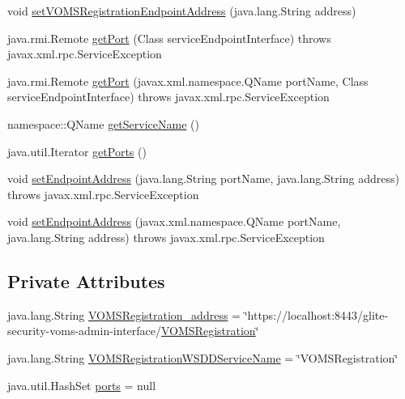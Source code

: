\begin{DoxyCompactItemize}
\item 
void \hyperlink{classorg_1_1glite_1_1security_1_1voms_1_1service_1_1registration_1_1VOMSRegistrationServiceLocator_a027076b3679899b742d499429827f488}{setVOMSRegistrationEndpointAddress} (java.lang.String address)
\item 
java.rmi.Remote \hyperlink{classorg_1_1glite_1_1security_1_1voms_1_1service_1_1registration_1_1VOMSRegistrationServiceLocator_ac0d38d86947d56afe47bd4042eaf2dbd}{getPort} (Class serviceEndpointInterface)  throws javax.xml.rpc.ServiceException 
\item 
java.rmi.Remote \hyperlink{classorg_1_1glite_1_1security_1_1voms_1_1service_1_1registration_1_1VOMSRegistrationServiceLocator_a138e62089c2450c8eacf2b94718d07cb}{getPort} (javax.xml.namespace.QName portName, Class serviceEndpointInterface)  throws javax.xml.rpc.ServiceException 
\item 
namespace::QName \hyperlink{classorg_1_1glite_1_1security_1_1voms_1_1service_1_1registration_1_1VOMSRegistrationServiceLocator_a7f4a3a45a9d544e0ee85ec1f456039fd}{getServiceName} ()
\item 
java.util.Iterator \hyperlink{classorg_1_1glite_1_1security_1_1voms_1_1service_1_1registration_1_1VOMSRegistrationServiceLocator_a4b23f185f25c87b26b1ce2d7f7be22b4}{getPorts} ()
\item 
void \hyperlink{classorg_1_1glite_1_1security_1_1voms_1_1service_1_1registration_1_1VOMSRegistrationServiceLocator_a682393f3ee2ac6cc3b0be395e46ae802}{setEndpointAddress} (java.lang.String portName, java.lang.String address)  throws javax.xml.rpc.ServiceException 
\item 
void \hyperlink{classorg_1_1glite_1_1security_1_1voms_1_1service_1_1registration_1_1VOMSRegistrationServiceLocator_acbaf26806a09fa835fe373b8a00ea630}{setEndpointAddress} (javax.xml.namespace.QName portName, java.lang.String address)  throws javax.xml.rpc.ServiceException 
\end{DoxyCompactItemize}
\subsection*{Private Attributes}
\begin{DoxyCompactItemize}
\item 
java.lang.String \hyperlink{classorg_1_1glite_1_1security_1_1voms_1_1service_1_1registration_1_1VOMSRegistrationServiceLocator_a8b1d238baa33c02d1366768aac9fb7bc}{VOMSRegistration\_\-address} = \char`\"{}https://localhost:8443/glite-\/security-\/voms-\/admin-\/interface/\hyperlink{interfaceorg_1_1glite_1_1security_1_1voms_1_1service_1_1registration_1_1VOMSRegistration}{VOMSRegistration}\char`\"{}
\item 
java.lang.String \hyperlink{classorg_1_1glite_1_1security_1_1voms_1_1service_1_1registration_1_1VOMSRegistrationServiceLocator_a37abee409465b82c58014954c0b576e9}{VOMSRegistrationWSDDServiceName} = \char`\"{}VOMSRegistration\char`\"{}
\item 
java.util.HashSet \hyperlink{classorg_1_1glite_1_1security_1_1voms_1_1service_1_1registration_1_1VOMSRegistrationServiceLocator_afe50260789264526462a9fe86fbd1a4f}{ports} = null
\end{DoxyCompactItemize}



